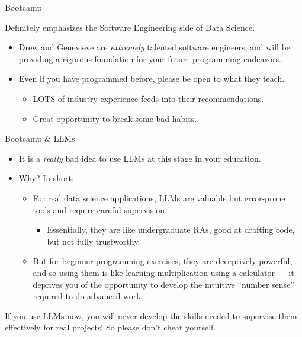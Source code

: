 \documentclass[11pt]{beamer}
\begin{document}
\begin{frame}[c]{Bootcamp}

Definitely emphasizes the Software Engineering side of Data Science.

\begin{itemize}
	\pause \item Drew and Genevieve are \emph{extremely} talented software engineers, and will be providing a rigorous foundation for your future programming endeavors.
	\pause \item Even if you have programmed before, please be open to what they teach.
	\begin{itemize}
		\item LOTS of industry experience feeds into their recommendations.
		\item Great opportunity to break some bad habits.
	\end{itemize}
\end{itemize}

\end{frame}

\begin{frame}[c]{Bootcamp \& LLMs}
\begin{itemize}
	\pause \item It is a \emph{really} bad idea to use LLMs at this stage in your education.
	\pause \item Why? In short: 
	\begin{itemize}
		\pause \item For \alert{real} data science applications, LLMs are \alert{valuable but error-prone} tools and require careful supervision. 
		\begin{itemize}
			\pause \item Essentially, they are like undergraduate RAs, good at drafting code, but not fully trustworthy.
		\end{itemize}
		\pause \item But for beginner programming exercises, they are deceptively powerful, and so using them is like learning multiplication using a calculator — it deprives you of the opportunity to develop the intuitive ``number sense'' required to do advanced work.
	\end{itemize}
\end{itemize}
\pause \alert{If you use LLMs now, you will never develop the skills needed to supervise them effectively for real projects!} So please don't cheat yourself.
\end{frame}
\end{document}
